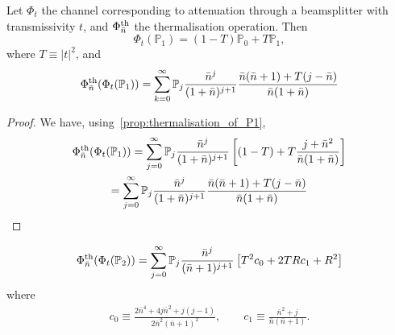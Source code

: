 \documentclass[12pt]{report}
\newcommand{\PP}{\mathbb{P}}
\begin{document}
\begin{prop}
	Let $\Phi_t$ the channel corresponding to attenuation through a beamsplitter with transmissivity $t$, and $\Phi_{\bar n}^{\rm th}$ the thermalisation operation. Then
	\begin{equation}
		\Phi_t(\PP_1)
		= (1-T) \PP_0 + T \PP_1,
	\end{equation}
	where $T\equiv|t|^2$, and
	\begin{equation}
		\Phi_{\bar n}^{\rm th}(\Phi_t(\PP_1))
		= \sum_{k=0}^\infty
		\PP_j
		\frac{\bar n^j}{(1+\bar n)^{j+1}}
		\frac{\bar n(\bar n+1) + T(j-\bar n)}{\bar n(1+\bar n)}
	\end{equation}
	\label{prop:attenuation_and_then_thermalisation_focks}
\end{prop}
\begin{proof}
	We have, using~\cref{prop:thermalisation_of_P1},
	\begin{equation}
	\begin{gathered}
		\Phi_{\bar n}^{\rm th}(\Phi_t(\PP_1))
		= \sum_{j=0}^\infty \PP_j
		\frac{\bar n^j}{(1+\bar n)^{j+1}} \left[
		(1-T) + T \frac{j+\bar n^2}{\bar n(1+\bar n)}
		\right] \\
		= \sum_{j=0}^\infty \PP_j
		\frac{\bar n^j}{(1+\bar n)^{j+1}}
		\frac{\bar n(\bar n+1)+ T(j-\bar n)}{\bar n(1+\bar n)}
	\end{gathered}
	\end{equation}
\end{proof}

\begin{prop}
	\begin{equation}
	\begin{gathered}
		\Phi_{\bar n}^{\rm th}(\Phi_t(\PP_2)) =
		\sum_{j=0}^\infty \PP_j \frac{\bar n^j}{(\bar n + 1)^{j+1}}
		\left[
		T^2 c_0
		+ 2TR c_1
		+R^2
		\right]
	\end{gathered}
	\end{equation}
	where
	\begin{equation}
	\begin{gathered}
		c_0 \equiv
			\frac{2\bar n^4 + 4j \bar n^2 + j(j-1)}{2\bar n^2 (\bar n+1)^2},
		\qquad
		c_1 \equiv
			\frac{\bar n^2 + j}{\bar n(\bar n+1)}.
	\end{gathered}
	\end{equation}
\end{prop}
\end{document}
